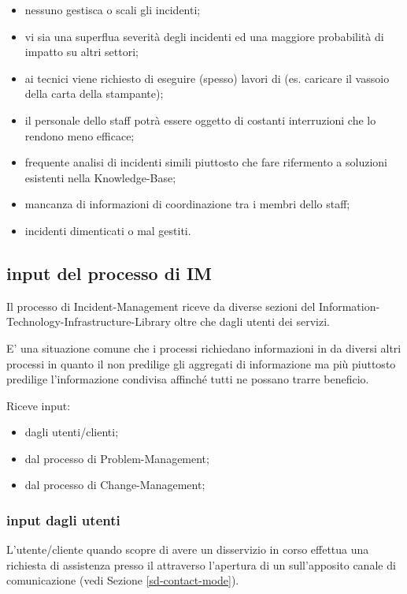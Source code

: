 \begin{itemize}
\item{nessuno gestisca o scali gli incidenti;}
\item{vi sia una superflua severità degli incidenti ed una maggiore probabilità di impatto su altri settori;}
\item{ai tecnici viene richiesto di eseguire (spesso) lavori di  (es. caricare il vassoio della carta della stampante);}
\item{il personale dello staff potrà essere oggetto di costanti interruzioni che lo rendono meno efficace;}
\item{frequente analisi di incidenti simili piuttosto che fare rifermento a soluzioni esistenti nella \ac{Knowledge-Base};}
\item{mancanza di informazioni di coordinazione tra i membri dello staff;}
\item{incidenti dimenticati o mal gestiti.}
\end{itemize}

\subsection[Input del processo di IM]{input del processo di IM}
\label{prc-incident-inputs}
Il processo di \ac{Incident-Management} riceve  da diverse sezioni del  \ac{Information-Technology-Infrastructure-Library} oltre che dagli utenti dei servizi.

E' una situazione comune che i processi richiedano informazioni in  da diversi altri processi in quanto il  non predilige gli aggregati di informazione ma più piuttosto predilige l'informazione condivisa affinché tutti ne possano trarre beneficio.

Riceve input:

\begin{itemize}
\item{dagli utenti/clienti;}
\item{dal processo di \ac{Problem-Management};}
\item{dal processo di \ac{Change-Management};}
\end{itemize}

\subsubsection[Input dagli utenti]{input dagli utenti}
L'utente/cliente quando scopre di avere un disservizio in corso effettua una richiesta di assistenza presso il  attraverso l'apertura di un  sull'apposito canale di comunicazione (vedi Sezione \ref{sd-contact-mode}).


